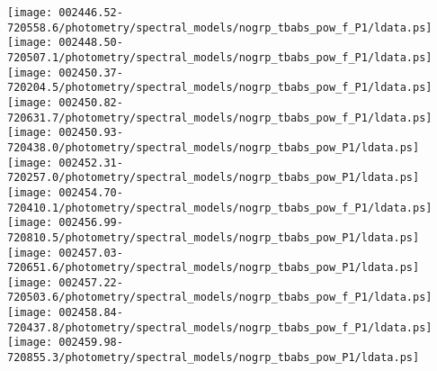 \documentclass{aastex}
\begin{document}
\begin{figure*}[!ht]
\centering
\texttt{[image: 002446.52-720558.6/photometry/spectral\_models/nogrp\_tbabs\_pow\_f\_P1/ldata.ps]} \hfill 
\texttt{[image: 002448.50-720507.1/photometry/spectral\_models/nogrp\_tbabs\_pow\_f\_P1/ldata.ps]} \hfill 
\texttt{[image: 002450.37-720204.5/photometry/spectral\_models/nogrp\_tbabs\_pow\_f\_P1/ldata.ps]} \\ 
\vspace*{0.5in}
\texttt{[image: 002450.82-720631.7/photometry/spectral\_models/nogrp\_tbabs\_pow\_f\_P1/ldata.ps]} \hfill 
\texttt{[image: 002450.93-720438.0/photometry/spectral\_models/nogrp\_tbabs\_pow\_P1/ldata.ps]} \hfill 
\texttt{[image: 002452.31-720257.0/photometry/spectral\_models/nogrp\_tbabs\_pow\_P1/ldata.ps]} \\ 
\vspace*{0.5in}
\texttt{[image: 002454.70-720410.1/photometry/spectral\_models/nogrp\_tbabs\_pow\_f\_P1/ldata.ps]} \hfill 
\texttt{[image: 002456.99-720810.5/photometry/spectral\_models/nogrp\_tbabs\_pow\_P1/ldata.ps]} \hfill 
\texttt{[image: 002457.03-720651.6/photometry/spectral\_models/nogrp\_tbabs\_pow\_P1/ldata.ps]} \\ 
\vspace*{0.5in}
\texttt{[image: 002457.22-720503.6/photometry/spectral\_models/nogrp\_tbabs\_pow\_f\_P1/ldata.ps]} \hfill 
\texttt{[image: 002458.84-720437.8/photometry/spectral\_models/nogrp\_tbabs\_pow\_f\_P1/ldata.ps]} \hfill 
\texttt{[image: 002459.98-720855.3/photometry/spectral\_models/nogrp\_tbabs\_pow\_P1/ldata.ps]} \\ 
\vspace*{0.5in}
\end{figure*}
\clearpage
\end{document}
